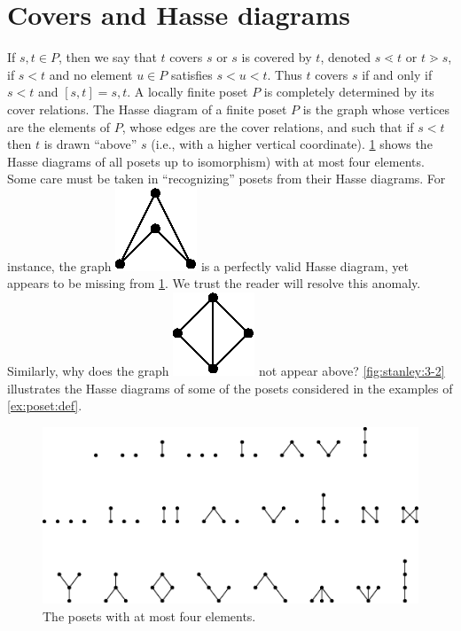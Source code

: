 \section{Covers and Hasse diagrams}

If $s, t \in P$, then we say that $t$ covers $s$ or $s$ is covered by $t$, denoted $s \lessdot t$ or $t \gtrdot s$, if $s < t$ and no element $u \in P$ satisfies $s < u < t$. Thus $t$ covers $s$ if and only if $s < t$ and $[s, t] = {s, t}$. A locally finite poset $P$ is completely determined by its cover relations. The Hasse diagram of a finite poset $P$ is the graph whose vertices are the elements of $P$, whose edges are the cover relations, and such that if $s < t$ then $t$ is drawn “above” $s$ (i.e., with a higher vertical coordinate). \ref{fig:stanley:3-1} shows the Hasse diagrams of all posets up to isomorphism) with at most four elements. Some care must be taken in “recognizing” posets from their Hasse diagrams. For instance, the graph \includegraphics{fig/stanley/3-1:a} is a perfectly valid Hasse diagram, yet appears to be missing from \ref{fig:stanley:3-1}. We trust the reader will resolve this anomaly. Similarly, why does the graph \includegraphics{fig/stanley/3-1:b} not appear above? \ref{fig:stanley:3-2} illustrates the Hasse diagrams of some of the posets considered in the examples of \ref{ex:poset:def}.

\begin{figure}
	\centering
	\includegraphics[width=\textwidth]{fig/stanley/3-1}
	\caption{\label{fig:stanley:3-1} The posets with at most four elements. \cite{Stanley:2011:ECV:2124415}}
\end{figure}


